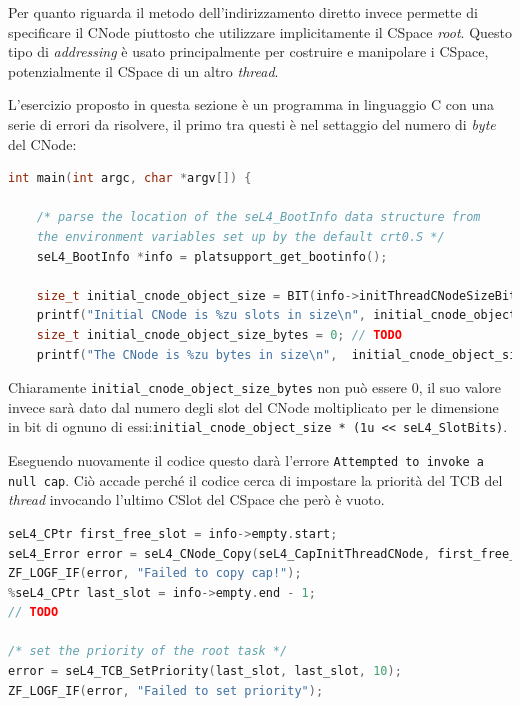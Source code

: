 Per quanto riguarda il metodo dell'indirizzamento diretto invece permette di specificare il CNode piuttosto che utilizzare implicitamente il CSpace \textit{root}. Questo tipo di \textit{addressing}  è usato principalmente per costruire e manipolare i CSpace, potenzialmente il CSpace di un altro \textit{thread}.

L'esercizio proposto in questa sezione è un programma in linguaggio C con una serie di errori da risolvere, il primo tra questi è nel settaggio del numero di \textit{byte} del CNode:
\begin{lstlisting}[language=C++]
int main(int argc, char *argv[]) {

    /* parse the location of the seL4_BootInfo data structure from
    the environment variables set up by the default crt0.S */
    seL4_BootInfo *info = platsupport_get_bootinfo();

    size_t initial_cnode_object_size = BIT(info->initThreadCNodeSizeBits);
    printf("Initial CNode is %zu slots in size\n", initial_cnode_object_size);
    size_t initial_cnode_object_size_bytes = 0; // TODO
    printf("The CNode is %zu bytes in size\n", 	initial_cnode_object_size_bytes);
\end{lstlisting}

Chiaramente \texttt{initial\_cnode\_object\_size\_bytes} non può essere 0, il suo valore invece sarà dato dal numero degli slot del CNode moltiplicato per le dimensione in bit di ognuno di essi:\texttt{initial\_cnode\_object\_size * (1u << seL4\_SlotBits)}.

Eseguendo nuovamente il codice questo darà l'errore \texttt{Attempted to invoke a null cap}. Ciò accade perché il codice cerca di impostare la priorità del TCB del \textit{thread} invocando l'ultimo CSlot del CSpace che però è vuoto.
\begin{lstlisting}[language=C++]
seL4_CPtr first_free_slot = info->empty.start;
seL4_Error error = seL4_CNode_Copy(seL4_CapInitThreadCNode, first_free_slot, seL4_WordBits, seL4_CapInitThreadCNode, seL4_CapInitThreadTCB, seL4_WordBits, seL4_AllRights);
ZF_LOGF_IF(error, "Failed to copy cap!");
%seL4_CPtr last_slot = info->empty.end - 1;
// TODO

/* set the priority of the root task */
error = seL4_TCB_SetPriority(last_slot, last_slot, 10);
ZF_LOGF_IF(error, "Failed to set priority");
\end{lstlisting}

